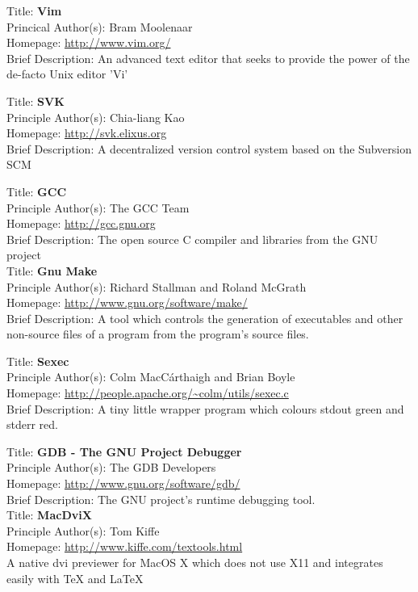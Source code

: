 
Title: 	\textbf{Vim}	\\
Princical Author(s): 	Bram Moolenaar	\\
Homepage: 	\url{http://www.vim.org/}	\\	
Brief Description: 		An advanced text editor that seeks to provide the power of the 
de-facto Unix editor 'Vi'


Title:		\textbf{SVK}	\\
Principle Author(s): 	Chia-liang Kao	\\
Homepage:		\url{http://svk.elixus.org}	\\
Brief Description:		A decentralized version control system based on the Subversion
SCM


Title:		\textbf{GCC}	\\	
Principle Author(s): 	The GCC Team	\\
Homepage:		\url{http://gcc.gnu.org}	\\
Brief Description:		The open source C compiler and libraries from the GNU project \\


Title:		\textbf{Gnu Make}	\\
Principle Author(s): 	Richard Stallman and Roland McGrath	\\
Homepage:		\url{http://www.gnu.org/software/make/} \\
Brief Description:		A tool which controls the generation of executables and other
non-source files of a program from the program's source files.


Title: 		\textbf{Sexec}	\\
Principle Author(s): 	Colm MacC\'{a}rthaigh and Brian Boyle	\\
Homepage:		\url{http://people.apache.org/~colm/utils/sexec.c} \\
Brief Description:		A tiny little wrapper program which colours stdout green 
and stderr red.


Title:		\textbf{GDB - The GNU Project Debugger}	\\	
Principle Author(s): 	The GDB Developers	\\
Homepage:		\url{http://www.gnu.org/software/gdb/}	\\
Brief Description: The GNU project's runtime debugging tool. \\


Title:		\textbf{MacDviX}	\\	
Principle Author(s): 	Tom Kiffe \\
Homepage:		\url{http://www.kiffe.com/textools.html}	\\
A native dvi previewer for MacOS X which does not use X11 and 
integrates easily with \TeX{} and \LaTeX{} \\


